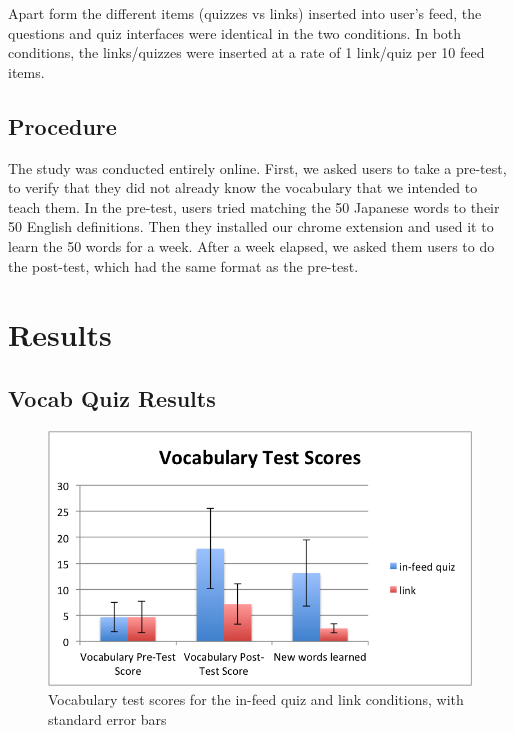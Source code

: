 \documentclass{chi-ext}
\begin{document}
Apart form the different items (quizzes vs links) inserted into user's feed, the questions and quiz interfaces were identical in the two conditions. In both conditions, the links/quizzes were inserted at a rate of 1 link/quiz per 10 feed items.


\subsection{Procedure}

The study was conducted entirely online. First, we asked users to take a pre-test, to verify that they did not already know the vocabulary that we intended to teach them. In the pre-test, users tried matching the 50 Japanese words to their 50 English definitions. Then they installed our chrome extension and used it to learn the 50 words for a week. After a week elapsed, we asked them users to do the post-test, which had the same format as the pre-test.

\section{Results}

\subsection{Vocab Quiz Results}

\begin{figure}
\centering
\includegraphics[width=1.0\columnwidth]{vocab-test-scores}
\caption{Vocabulary test scores for the in-feed quiz and link conditions, with standard error bars}
\label{fig:vocab-test-scores}
\end{figure}
\end{document}
